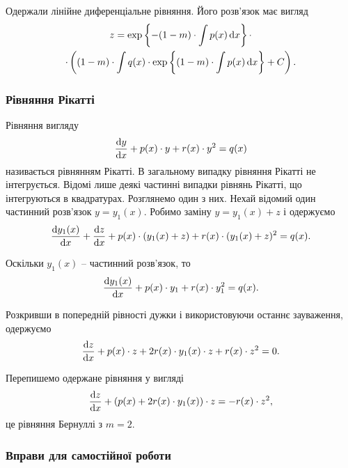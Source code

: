 Одержали лінійне диференціальне рівняння. Його розв’язок має вигляд
\begin{multline*}
	z = \exp\left\{ -(1 - m) \cdot \int p(x) \mathop{}\!\mathrm{d} x \right\} \cdot \\
	\cdot \left( (1-m) \cdot \int q(x) \cdot \exp\left\{ (1 - m) \cdot \int p(x) \mathop{}\!\mathrm{d} x \right\} + C\right).
\end{multline*}
 
\subsubsection{Рівняння Рікатті}

Рівняння вигляду 
\begin{equation*}
	\frac{\mathop{}\!\mathrm{d} y}{\mathop{}\!\mathrm{d} x} + p(x) \cdot y + r(x) \cdot y^2 = q(x)
\end{equation*} 
називається рівнянням Рікатті. В загальному випадку рівняння Рікатті не інтегрується. Відомі лише деякі частинні випадки рівнянь Рікатті, що інтегруються в квадратурах. Розглянемо один з них. Нехай відомий один частинний розв’язок $y = y_1(x)$. Робимо заміну $y = y_1(x) + z$ і одержуємо
\begin{equation*}
	\frac{\mathop{}\!\mathrm{d} y_1(x)}{\mathop{}\!\mathrm{d} x} + \frac{\mathop{}\!\mathrm{d} z}{\mathop{}\!\mathrm{d} x} + p(x) \cdot (y_1(x) + z) + r(x) \cdot (y_1(x) + z)^2 = q(x).
\end{equation*}

Оскільки $y_1(x)$ -- частинний розв’язок, то
\begin{equation*}
	\frac{\mathop{}\!\mathrm{d} y_1(x)}{\mathop{}\!\mathrm{d} x} + p(x) \cdot y_1 + r(x) \cdot y_1^2 = q(x).
\end{equation*}

Розкривши в попередній рівності дужки і використовуючи останнє зауваження, одержуємо
\begin{equation*}
	\frac{\mathop{}\!\mathrm{d} z}{\mathop{}\!\mathrm{d} x} + p(x) \cdot z + 2 r(x) \cdot y_1(x) \cdot z + r(x) \cdot z^2 = 0.
\end{equation*}

Перепишемо одержане рівняння у вигляді
\begin{equation*}
	\frac{\mathop{}\!\mathrm{d} z}{\mathop{}\!\mathrm{d} x} + \left(p(x) + 2 r(x) \cdot y_1(x)\right) \cdot z = - r(x) \cdot z^2 ,
\end{equation*}
це рівняння Бернуллі з $m = 2$.

\subsubsection{Вправи для самостійної роботи}

